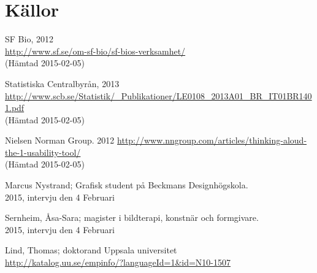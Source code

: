\documentclass[swedish,a4paper,11pt]{article}
\begin{document}
\newpage
\section{Källor}

\begin{enumerate}[label={[\arabic*]}]
  \item SF Bio, 2012  \\
\url{http://www.sf.se/om-sf-bio/sf-bios-verksamhet/}\\{(Hämtad 2015-02-05)}

  \item Statistiska Centralbyrån, 2013\\
\url{http://www.scb.se/Statistik/_Publikationer/LE0108_2013A01_BR_IT01BR1401.pdf}\\{(Hämtad 2015-02-05)
} 
  
  \item Nielsen Norman Group. 2012 \url{http://www.nngroup.com/articles/thinking-aloud-the-1-usability-tool/}\\{(Hämtad 2015-02-05)}  
  
  \item Marcus Nystrand; Grafisk student på Beckmans Designhögskola. \\
2015, intervju den 4 Februari
  
  \item Sernheim, Åsa-Sara; magister i bildterapi, konstnär och formgivare.\\ 
2015, intervju den 4 Februari
  
  \item Lind, Thomas; doktorand Uppsala universitet\\
\url{http://katalog.uu.se/empinfo/?languageId=1&id=N10-1507}
\end{enumerate}
\end{document}
